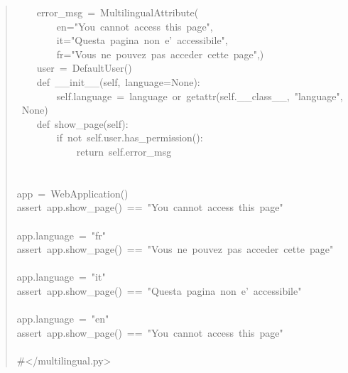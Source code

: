 \documentclass[10pt,a4paper,english]{article}
\begin{document}
\begin{quote}
{~~~~error{\_}msg~=~MultilingualAttribute(~\\
~~~~~~~~en="You~cannot~access~this~page",~\\
~~~~~~~~it="Questa~pagina~non~e'~accessibile",~\\
~~~~~~~~fr="Vous~ne~pouvez~pas~acceder~cette~page",)~\\
~~~~user~=~DefaultUser()~\\
~~~~def~{\_}{\_}init{\_}{\_}(self,~language=None):~\\
~~~~~~~~self.language~=~language~or~getattr(self.{\_}{\_}class{\_}{\_},~"language",~None)~\\
~~~~def~show{\_}page(self):~\\
~~~~~~~~if~not~self.user.has{\_}permission():~\\
~~~~~~~~~~~~return~self.error{\_}msg~\\
~\\
~\\
app~=~WebApplication()~\\
assert~app.show{\_}page()~==~"You~cannot~access~this~page"~\\
~\\
app.language~=~"fr"~\\
assert~app.show{\_}page()~==~"Vous~ne~pouvez~pas~acceder~cette~page"~\\
~\\
app.language~=~"it"~\\
assert~app.show{\_}page()~==~"Questa~pagina~non~e'~accessibile"~\\
~\\
app.language~=~"en"~\\
assert~app.show{\_}page()~==~"You~cannot~access~this~page"~\\
~\\
{\#}</multilingual.py>
}\end{quote}
\end{document}
